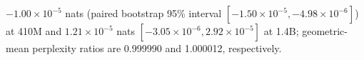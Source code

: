 $-1.00\!\times\!10^{-5}$ nats (paired bootstrap 95\% interval $[-1.50\!\times\!10^{-5},-4.98\!\times\!10^{-6}]$) at 410M and $1.21\!\times\!10^{-5}$ nats $[-3.05\!\times\!10^{-6},2.92\!\times\!10^{-5}]$ at 1.4B; geometric-mean perplexity ratios are 0.999990 and 1.000012, respectively.

